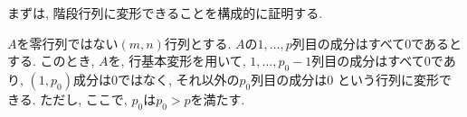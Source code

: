 まずは,
階段行列に変形できることを構成的に証明する.
\begin{lemma}
  \label{lem:reduction:f}
  $A$を零行列ではない$(m,n)$行列とする.
  $A$の$1,\ldots,p$列目の成分はすべて$0$であるとする.
  このとき, $A$を, 行基本変形を用いて,
  $1,\ldots,p_0-1$列目の成分はすべて$0$であり,
  $(1,p_0)$成分は$0$ではなく,
  それ以外の$p_0$列目の成分は$0$
  という行列に変形できる.
  ただし, ここで, $p_0$は$p_0>p$を満たす.
\end{lemma}
